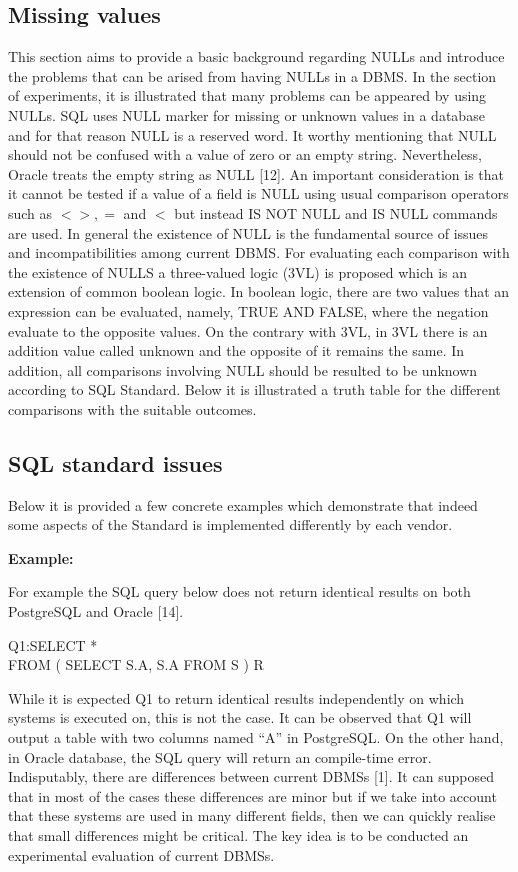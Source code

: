 \subsection{Missing values} 

This section aims to provide a basic background regarding NULLs and introduce the problems that can be arised from having NULLs in a DBMS. In the section of experiments, it is illustrated that many problems can be appeared by using NULLs. SQL uses NULL marker for missing or unknown values in a database and for that reason NULL is a reserved word. It worthy mentioning that NULL should not be confused with a value of zero or an empty string. Nevertheless, Oracle treats the empty string as NULL [12].  An important consideration is that it cannot be tested if a value of a field is NULL using usual comparison operators such as $ <>, = $ and $<$ but instead IS NOT NULL and IS NULL commands are used. In general the existence of NULL is the fundamental source of issues and incompatibilities among current DBMS. For evaluating each comparison with the existence of NULLS a three-valued logic (3VL) is proposed which is an extension of common boolean logic. In boolean logic, there are two values that an expression can be evaluated, namely, TRUE AND FALSE, where the negation evaluate to the opposite values. On the contrary with 3VL, in 3VL there is an addition value called unknown and the opposite of it remains the same. In addition, all comparisons involving NULL should be resulted to be unknown according to SQL Standard. Below it is illustrated a truth table for the different comparisons with the suitable outcomes.    

\subsection{SQL standard issues} 

Below it is provided a few concrete examples which demonstrate that indeed some aspects of the Standard is implemented differently by each vendor. 
 
\noindent\textbf{Example:}

For example the SQL query below does not return identical results on both PostgreSQL and Oracle [14]. 


\begin{mdframed}[backgroundcolor=gray!20][h] 
Q1:SELECT * 
 \\FROM ( SELECT S.A, S.A FROM S ) R
\end{mdframed}

While it is expected Q1 to return identical results independently on which systems is executed on, this is not the case. It can be observed that Q1 will output a table with two columns named “A” in PostgreSQL. On the other hand, in Oracle database, the SQL query will return an compile-time error. Ιndisputably, there are differences between current DBMSs [1]. 
It can supposed that in most of the cases these differences are minor but if we take into account that these systems are used in many different fields, then we can quickly realise that small differences might be critical. The key idea is to be conducted an experimental evaluation of current DBMSs. 




